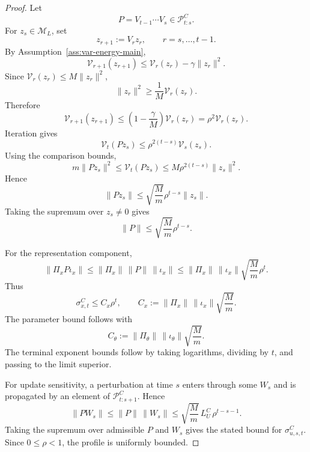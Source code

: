 \documentclass[10pt,a4paper]{amsart}
\begin{document}
\begin{proof}
Let
\[
P=V_{t-1}\cdots V_s\in\mathcal{P}_{t:s}^C .
\]
For \(z_s\in\mathcal{M}_L\), set
\[
z_{r+1}:=V_rz_r,
\qquad
r=s,\ldots,t-1 .
\]
By Assumption~\ref{ass:var-energy-main},
\[
\mathcal{V}_{r+1}(z_{r+1})
\le
\mathcal{V}_r(z_r)-\gamma\|z_r\|^2 .
\]
Since \(\mathcal{V}_r(z_r)\le M\|z_r\|^2\),
\[
\|z_r\|^2\ge \frac{1}{M}\mathcal{V}_r(z_r).
\]
Therefore
\[
\mathcal{V}_{r+1}(z_{r+1})
\le
\left(1-\frac{\gamma}{M}\right)\mathcal{V}_r(z_r)
=
\rho^2\mathcal{V}_r(z_r).
\]
Iteration gives
\[
\mathcal{V}_t(Pz_s)
\le
\rho^{2(t-s)}\mathcal{V}_s(z_s).
\]
Using the comparison bounds,
\[
m\|Pz_s\|^2
\le
\mathcal{V}_t(Pz_s)
\le
M\rho^{2(t-s)}\|z_s\|^2 .
\]
Hence
\[
\|Pz_s\|
\le
\sqrt{\frac{M}{m}}\rho^{t-s}\|z_s\|.
\]
Taking the supremum over \(z_s\ne0\) gives
\[
\|P\|
\le
\sqrt{\frac{M}{m}}\rho^{t-s}.
\]

For the representation component,
\[
\|\Pi_xP\iota_x\|
\le
\|\Pi_x\|\,\|P\|\,\|\iota_x\|
\le
\|\Pi_x\|\,\|\iota_x\|\sqrt{\frac{M}{m}}\rho^t .
\]
Thus
\[
\sigma_{x,t}^C\le C_x\rho^t,
\qquad
C_x:=\|\Pi_x\|\,\|\iota_x\|\sqrt{\frac{M}{m}} .
\]
The parameter bound follows with
\[
C_\theta:=\|\Pi_\theta\|\,\|\iota_\theta\|\sqrt{\frac{M}{m}} .
\]
The terminal exponent bounds follow by taking logarithms, dividing by \(t\),
and passing to the limit superior.

For update sensitivity, a perturbation at time \(s\) enters through some
\(W_s\) and is propagated by an element of \(\mathcal{P}_{t:s+1}^C\). Hence
\[
\|PW_s\|
\le
\|P\|\,\|W_s\|
\le
\sqrt{\frac{M}{m}}\,L_U^C\,\rho^{t-s-1}.
\]
Taking the supremum over admissible \(P\) and \(W_s\) gives the stated bound for
\(\sigma_{u,s,t}^C\). Since \(0\le\rho<1\), the profile is uniformly bounded.
\end{proof}
\end{document}
